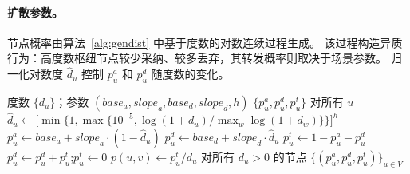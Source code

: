\documentclass[sigconf,balance=false]{acmart}
\begin{document}
\begin{table}[t]
  \caption{实验所用数据集。}
  \label{tab:datasets}
  \centering
\end{table}

\paragraph{扩散参数。}
节点概率由算法~\ref{alg:gendist} 中基于度数的对数连续过程生成。
该过程构造异质行为：高度数枢纽节点较少采纳、较多丢弃，其转发概率则取决于场景参数。
归一化对数度 $\hat{d}_u$ 控制 $p_u^a$ 和 $p_u^d$ 随度数的变化。

\begin{algorithm}[t]
\caption{基于度数的节点概率生成}
\label{alg:gendist}
\begin{algorithmic}[1]
\Require 度数 $\{d_u\}$；参数
  $(\mathit{base}_a, \mathit{slope}_a, \mathit{base}_d,
    \mathit{slope}_d, h)$
\Ensure $\{p_u^a, p_u^d, p_u^t\}$ 对所有 $u$
  \State $\hat{d}_u \gets
    \bigl[\min\{1,\max\{10^{-5},
    \log(1{+}d_u)/\max_w\log(1{+}d_w)\}\}\bigr]^h$
\EndFor
{}
  \State $p_u^a \gets \mathit{base}_a
    + \mathit{slope}_a \cdot (1-\hat{d}_u)$
  \State $p_u^d \gets \mathit{base}_d
    + \mathit{slope}_d \cdot \hat{d}_u$
  \State $p_u^t \gets 1 - p_u^a - p_u^d$
    \State $p_u^d\gets p_u^d+p_u^t$;\quad $p_u^t\gets0$
  \EndIf
\EndFor
\State $p(u,v) \gets p_u^t / d_u$ 对所有 $d_u>0$ 的节点
\State \Return $\{(p_u^a, p_u^d, p_u^t)\}_{u\in V}$
\end{algorithmic}
\end{algorithm}
\end{document}
